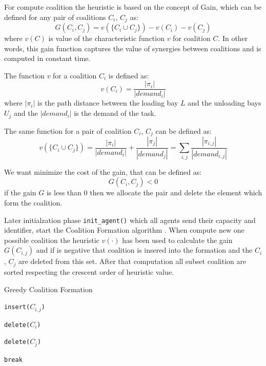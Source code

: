 For compute coalition the heuristic is based on the concept of Gain, which can be 
defined for any pair of coalitions $C_i$, $C_j$ as:
\[G(C_i,C_j) = v(\{C_i \cup C_j\}) - v(C_i) - v(C_j)\]
where $v(C)$ is value of the characteristic function $v$ for coalition $C$. 
In other words, this gain function captures the value of synergies between coalitions
and is computed in constant time.

The function $v$ for a coalition $C_i$ is defined as:
\[ v(C_i) = \frac{|\pi_i|}{|demand_i|}\]
where $|\pi_i|$ is the path distance between the loading bay $L$ and the unloading bays $U_j$
and the $|demand_i|$ is the demand of the task.

The same function for a pair of coalition $C_i$, $C_j$ can be defined as:
\[  v(\{C_i \cup C_j\}) = \frac{|\pi_i|}{|demand_i|} + \frac{|\pi_j|}{|demand_j|} = \sum_{i,j} \frac{|\pi_{i,j}|}{|demand_{i,j}|} \]

We want minimize the cost of the gain, that can be defined as:
\[G(C_i,C_j) < 0 \]
if the gain $G$ is less than 0 then we allocate the pair and delete the element which
form the coalition.

Later initialzation phase \texttt{init\_agent()} which all agents send their capacity and identifier,
start the Coalition Formation algorithm \cite{cf_greedy}.
When compute new one possible coalition the heuristic  $v(\cdot)$ has been used to calculate 
the gain $G(C_{i,j})$ and if is negative that coalition is insered into the formation and the 
$C_i$ , $C_j$ are deleted from this set.
After that computation all subset coalition are sorted respecting the crescent order of heuristic
value.

\begin{algorithm}
\caption{Greedy Coalition Formation} \label{GCF}
\begin{algorithmic}[1]

        \texttt{insert(}$C_{i,j}$\texttt{)}

        \texttt{delete(}$C_i$\texttt{)}
  
        \texttt{delete(}$C_j$\texttt{)} 

        \texttt{break}
  \EndIf
  \EndIf
\EndFor
\EndFor
\EndProcedure
\end{algorithmic}
\end{algorithm}


